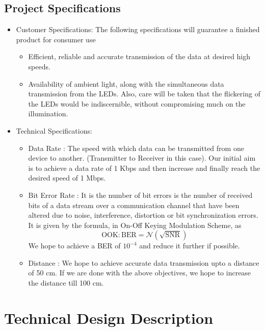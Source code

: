 \documentclass{article}
\begin{document}
\subsection{Project Specifications}
\begin{itemize}
\item Customer Specifications: The following specifications will guarantee a finished product for consumer use
  \begin{itemize}
  \item Efficient, reliable and accurate transmission of the data at desired high speeds.
  \item Availability of ambient light, along with the simultaneous data transmission from the LEDs. Also, care will be taken that the flickering of the LEDs would be indiscernible, without compromising much on the illumination.  
  \end{itemize}
\item Technical Specifications: 
  \begin{itemize}
  \item Data Rate : The speed with which data can be transmitted from one device to another. (Transmitter to Receiver in this case). Our initial aim is to achieve a data rate of 1 Kbps and then increase and finally reach the desired speed of 1 Mbps.
  \item Bit Error Rate : It is the number of bit errors is the number of received bits of a data stream over a communication channel that have been altered due to noise, interference, distortion or bit synchronization errors. It is given by the formula, in On-Off Keying Modulation Scheme, as $$\textrm{OOK} : \textrm{BER} = \mathcal{N}(\sqrt{\textrm{SNR}})$$ We hope to achieve a BER of $10^{-4}$ and reduce it further if possible.
  \item Distance : We hope to achieve accurate data transmission upto a distance of 50 cm. If       we are done with the above objectives, we hope to increase the distance till 100 cm.  
  \end{itemize}
\end{itemize}

\section{Technical Design Description}
\end{document}
